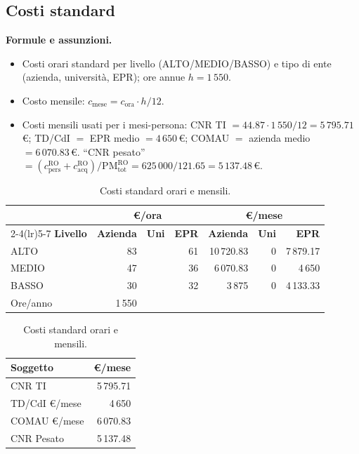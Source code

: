 \documentclass{plan4ari_report}
\begin{document}
\subsection{Costi standard}
\textbf{Formule e assunzioni.}
\begin{itemize}
  \item Costi orari standard per livello (ALTO/MEDIO/BASSO) e tipo di ente (azienda, universit\`a, EPR); ore annue $h = 1\,550$.
  \item Costo mensile: $c_{\mathrm{mese}} = c_{\mathrm{ora}}\cdot h/12$.
  \item Costi mensili usati per i mesi-persona: CNR TI $= 44.87\cdot 1\,550/12 = 5\,795.71$\,\euro; TD/CdI $=$ EPR medio $= 4\,650$\,\euro; COMAU $=$ azienda medio $= 6\,070.83$\,\euro. ``CNR pesato'' $= (c^{\mathrm{RO}}_{\mathrm{pers}} + c^{\mathrm{RO}}_{\mathrm{acq}})/\mathrm{PM}^{\mathrm{RO}}_{\mathrm{tot}} = 625\,000/121.65 = 5\,137.48$\,\euro.
\end{itemize}

\begin{table}[H]\centering\small\caption{Costi standard orari e mensili.}\label{tab:std}
\begin{tabular}{lrrrrrr}\toprule
& \multicolumn{3}{c}{\textbf{\euro/ora}} & \multicolumn{3}{c}{\textbf{\euro/mese}} \\\cmidrule(lr){2-4}\cmidrule(lr){5-7}
\textbf{Livello} & \textbf{Azienda} & \textbf{Uni} & \textbf{EPR} & \textbf{Azienda} & \textbf{Uni} & \textbf{EPR} \\\midrule
ALTO & 83 &  & 61 & 10\,720.83 & 0 & 7\,879.17 \\
MEDIO & 47 &  & 36 & 6\,070.83 & 0 & 4\,650 \\
BASSO & 30 &  & 32 & 3\,875 & 0 & 4\,133.33 \\
\midrule Ore/anno & 1\,550 & & & & & \\
\bottomrule\end{tabular}\par\medskip
\begin{tabular}{lr}\toprule\textbf{Soggetto} & \textbf{\euro/mese} \\\midrule
CNR TI & 5\,795.71 \\
TD/CdI \euro{}/mese & 4\,650 \\
COMAU \euro{}/mese & 6\,070.83 \\
CNR Pesato & 5\,137.48 \\
\bottomrule\end{tabular}\end{table}
\end{document}
